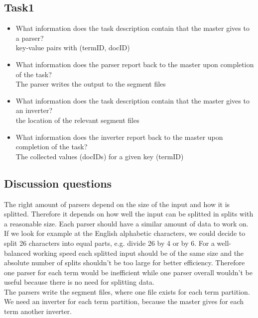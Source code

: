 \subsection*{Task1}

\begin{itemize}
    \item What information does the task description contain that the master gives to a parser?\\
    key-value pairs with (termID, docID)\\
    \item What information does the parser report back to the master upon completion of the task?\\
    The parser writes the output to the segment files\\
    \item What information does the task description contain that the master gives to an inverter?\\
    the location of the relevant segment files\\
    \item What information does the inverter report back to the master upon completion of the task?\\
    The collected values (docIDs) for a given key (termID)
\end{itemize}

\subsection*{Discussion questions}
The right amount of parsers depend on the size of the input and how it is splitted. Therefore it depends on how well the input can be splitted
in splits with a reasonable size. Each parser should have a similar amount of data to work on.
If we look for example at the English alphabetic characters, we could decide to split 26 characters into equal parts, e.g. divide 26 by 4 or by 6.
For a well-balanced working speed each splitted input should be of the same size and the absolute number of splits shouldn't be too large for better
efficiency. Therefore one parser for each term would be inefficient while one parser overall wouldn't be useful because there is no need for splitting data.\\

The parsers write the segment files, where one file exists for each term partition. We need an inverter for each term partition, because the master
gives for each term another inverter.\\
